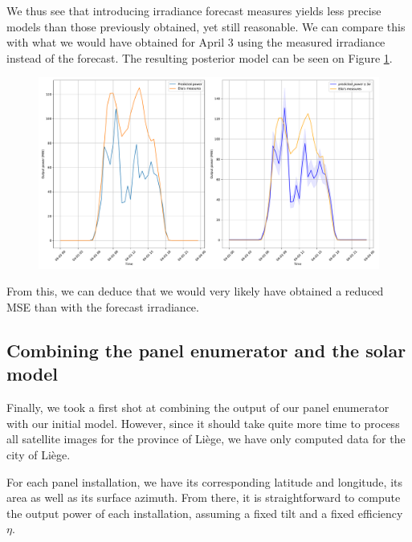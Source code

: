 \documentclass[a4paper, 12pt]{article}
\begin{document}
We thus see that introducing irradiance forecast measures yields less precise models than those previously obtained, yet still reasonable. We can compare this with what we would have obtained for April 3 using the measured irradiance instead of the forecast. The resulting posterior model can be seen on Figure \ref{fig:naive_post_meas}.
\begin{figure}[H]
    \centering
    \includegraphics[width=\textwidth]{resources/pdf/comparison_naive_posterior (27-03-2020)_meas.pdf}
    \label{fig:naive_post_meas}
\end{figure}
From this, we can deduce that we would very likely have obtained a reduced MSE than with the forecast irradiance.

\subsection{Combining the panel enumerator and the solar model}
Finally, we took a first shot at combining the output of our panel enumerator with our initial model. However, since it should take quite more time to process all satellite images for the province of Liège, we have only computed data for the city of Liège.

For each panel installation, we have its corresponding latitude and longitude, its area as well as its surface azimuth. From there, it is straightforward to compute the output power of each installation, assuming a fixed tilt and a fixed efficiency $\eta$.
\end{document}

